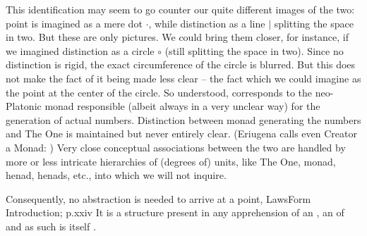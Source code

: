 {  This identification may seem to go counter our quite different images of the
  two: point is imagined as a mere dot $\cdot$, while distinction as a line $|$
  splitting the space in two. But these are only pictures. We could bring them
  closer, for instance, if we imagined distinction as a circle $\circ$ (still
  splitting the space in two). Since no distinction is rigid, the exact
  circumference of the circle is blurred. But this does not make the fact of it
  being made less clear -- the fact which we could imagine as the point at the
  center of the circle. So understood,  corresponds to the
  neo-Platonic monad responsible (albeit always in a very unclear way) for the
  generation of actual numbers.  
  Distinction between monad generating the numbers and The One is maintained but
  never entirely clear.  (Eriugena calls even Creator a Monad: ) Very close conceptual associations between
  the two are handled by more or less intricate hierarchies of (degrees of)
  units, like The One, monad, henad, henads, etc., into which we will not
  inquire.  }


Consequently, no abstraction is needed to arrive at a point, \citet{we have a
  direct awareness of mathematical form as an archetypal structure.}{LawsForm}{
  Introduction; p.xxiv} It is a structure present in any apprehension of an
, an  of  and as such is itself
.

